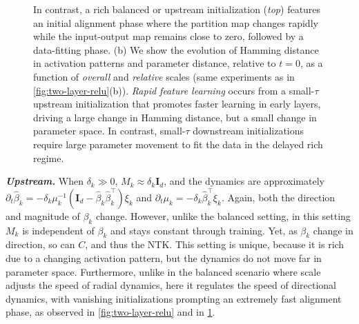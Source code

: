\documentclass{article}
\theoremstyle{plain}
\theoremstyle{definition}
\theoremstyle{remark}
\begin{document}
\begin{figure}[t]
{    %
    In contrast, a rich balanced or upstream initialization (\textit{top}) features an initial alignment phase where the partition map changes rapidly while the input-output map remains close to zero, followed by a data-fitting phase.
    (b) We show the evolution of Hamming distance in activation patterns and parameter distance, relative to $t=0$, as a function of \textit{overall} and \textit{relative} scales (same experiments as in \cref{fig:two-layer-relu}(b)). \emph{Rapid feature learning} occurs from a small-$\tau$ upstream initialization that promotes faster learning in early layers, driving a large change in Hamming distance, but a small change in parameter space. In contrast, small-$\tau$ downstream initializations require large parameter movement to fit the data in the delayed rich regime.}
    \vspace{-20pt}
    \label{fig:xor-dynamics}
\end{figure}

\emph{\textbf{Upstream.}}
%
When $\delta_k \gg 0$, $M_k \approx \delta_k \mathbf{I}_d$, and the dynamics are approximately $\partial_t\hat{\beta}_k = -\delta_k\mu_k^{-1}(\mathbf{I}_d - \hat{\beta}_k\hat{\beta}_k^\intercal)\xi_k$ and $\partial_t\mu_k = -\delta_k\hat{\beta}_k^\intercal \xi_k$.
%
Again, both the direction and magnitude of $\beta_k$ change.
%
However, unlike the balanced setting, in this setting $M_k$ is independent of $\beta_k$ and stays constant through training.
%
Yet, as $\beta_k$ change in direction, so can $C$, and thus the NTK.
%
This setting is unique, because it is rich due to a changing activation pattern, but the dynamics do not move far in parameter space.
%
Furthermore, unlike in the balanced scenario where scale adjusts the speed of radial dynamics, here it regulates the speed of directional dynamics, with vanishing initializations prompting an extremely fast alignment phase, as observed in \cref{fig:two-layer-relu} and in \cref{fig:xor-dynamics}.
%
\end{document}
